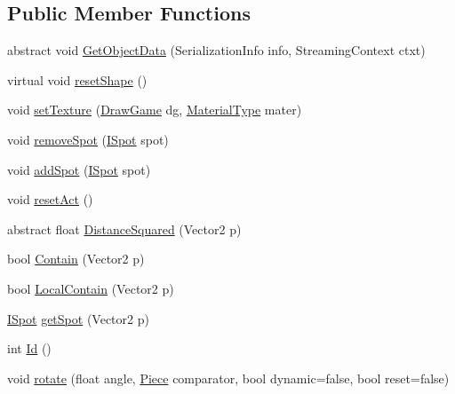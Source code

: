\subsection*{Public Member Functions}
\begin{DoxyCompactItemize}
\item 
abstract void \hyperlink{classgearit_1_1src_1_1robot_1_1_piece_acdaa01c5a96d67505c78c84a43739cf5}{Get\+Object\+Data} (Serialization\+Info info, Streaming\+Context ctxt)
\item 
virtual void \hyperlink{classgearit_1_1src_1_1robot_1_1_piece_a7138381e04573eb0385cef9d43f3e813}{reset\+Shape} ()
\item 
void \hyperlink{classgearit_1_1src_1_1robot_1_1_piece_a7853b0c5286960d4f6c117a132d1c13a}{set\+Texture} (\hyperlink{classgearit_1_1src_1_1_draw_game}{Draw\+Game} dg, \hyperlink{namespacegearit_1_1src_1_1utility_a1a6b5ed88f62fe3a535053fa2d4fa491}{Material\+Type} mater)
\item 
void \hyperlink{classgearit_1_1src_1_1robot_1_1_piece_a437355c3fe754b6007c26e5f08a4d0e8}{remove\+Spot} (\hyperlink{interfacegearit_1_1src_1_1robot_1_1_i_spot}{I\+Spot} spot)
\item 
void \hyperlink{classgearit_1_1src_1_1robot_1_1_piece_ac44f258dd88e48b639e7016019703d24}{add\+Spot} (\hyperlink{interfacegearit_1_1src_1_1robot_1_1_i_spot}{I\+Spot} spot)
\item 
void \hyperlink{classgearit_1_1src_1_1robot_1_1_piece_af7b23e31638ea432071194ce735156a6}{reset\+Act} ()
\item 
abstract float \hyperlink{classgearit_1_1src_1_1robot_1_1_piece_a6cd722f6fe034264f9256cfbb195d255}{Distance\+Squared} (Vector2 p)
\item 
bool \hyperlink{classgearit_1_1src_1_1robot_1_1_piece_acaf17d46dfbb63584c2a0d06a6e9df82}{Contain} (Vector2 p)
\item 
bool \hyperlink{classgearit_1_1src_1_1robot_1_1_piece_a9800faf55fb67996a3d5085c424f000c}{Local\+Contain} (Vector2 p)
\item 
\hyperlink{interfacegearit_1_1src_1_1robot_1_1_i_spot}{I\+Spot} \hyperlink{classgearit_1_1src_1_1robot_1_1_piece_a6a573bef5c079be7de39dfdba9eac0f3}{get\+Spot} (Vector2 p)
\item 
int \hyperlink{classgearit_1_1src_1_1robot_1_1_piece_abb4ca140935f78c00f8e5168fbd53084}{Id} ()
\item 
void \hyperlink{classgearit_1_1src_1_1robot_1_1_piece_ad62aad475f917d24e964d77933ebdeb2}{rotate} (float angle, \hyperlink{classgearit_1_1src_1_1robot_1_1_piece}{Piece} comparator, bool dynamic=false, bool reset=false)

\end{DoxyCompactItemize}
